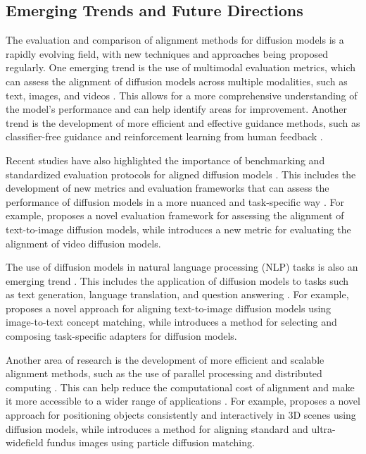 \documentclass[11pt,a4paper]{article}
\begin{document}
\subsection{Emerging Trends and Future Directions}


The evaluation and comparison of alignment methods for diffusion models is a rapidly evolving field, with new techniques and approaches being proposed regularly. One emerging trend is the use of multimodal evaluation metrics, which can assess the alignment of diffusion models across multiple modalities, such as text, images, and videos \cite{doi:10.18653/v1/d19-1136}. This allows for a more comprehensive understanding of the model's performance and can help identify areas for improvement. Another trend is the development of more efficient and effective guidance methods, such as classifier-free guidance and reinforcement learning from human feedback \cite{doi:10.1007/s41019-024-00272-9}.

Recent studies have also highlighted the importance of benchmarking and standardized evaluation protocols for aligned diffusion models \cite{arxiv:2508.09937}. This includes the development of new metrics and evaluation frameworks that can assess the performance of diffusion models in a more nuanced and task-specific way \cite{doi:10.1186/s12864-020-6569-1}. For example, \cite{doi:10.1007/s41019-024-00272-9} proposes a novel evaluation framework for assessing the alignment of text-to-image diffusion models, while \cite{doi:10.1109/cvpr52734.2025.00750} introduces a new metric for evaluating the alignment of video diffusion models.

The use of diffusion models in natural language processing (NLP) tasks is also an emerging trend \cite{arxiv:2211.06235}. This includes the application of diffusion models to tasks such as text generation, language translation, and question answering \cite{arxiv:2502.10458}. For example, \cite{arxiv:2404.03653} proposes a novel approach for aligning text-to-image diffusion models using image-to-text concept matching, while \cite{arxiv:2404.18928} introduces a method for selecting and composing task-specific adapters for diffusion models.

Another area of research is the development of more efficient and scalable alignment methods, such as the use of parallel processing and distributed computing \cite{arxiv:2406.06382}. This can help reduce the computational cost of alignment and make it more accessible to a wider range of applications \cite{arxiv:2503.12575}. For example, \cite{arxiv:2601.14056} proposes a novel approach for positioning objects consistently and interactively in 3D scenes using diffusion models, while \cite{doi:10.1109/tip.2026.3653198} introduces a method for aligning standard and ultra-widefield fundus images using particle diffusion matching.
\end{document}
